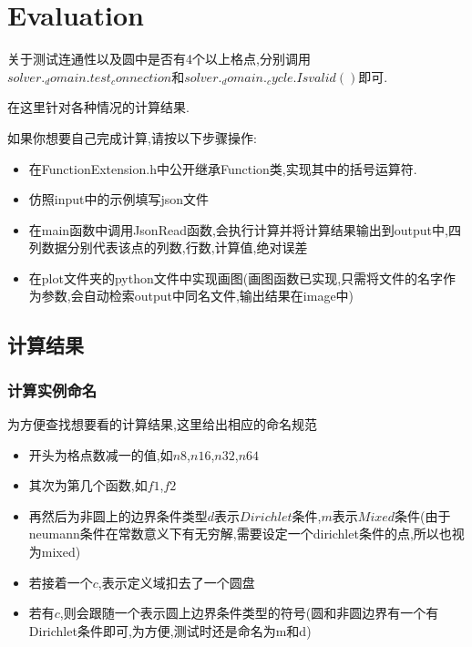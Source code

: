 \chapter{Evaluation}
\label{ch:evaluation}



关于测试连通性以及圆中是否有4个以上格点,分别调用$solver._domain.test_connection$和$solver._domain._cycle.Isvalid()$即可.

在这里针对各种情况的计算结果.

如果你想要自己完成计算,请按以下步骤操作:
\begin{itemize}
    \item 在FunctionExtension.h中公开继承Function类,实现其中的括号运算符.
    \item 仿照input中的示例填写json文件
    \item 在main函数中调用JsonRead函数,会执行计算并将计算结果输出到output中,四列数据分别代表该点的列数,行数,计算值,绝对误差
    \item 在plot文件夹的python文件中实现画图(画图函数已实现,只需将文件的名字作为参数,会自动检索output中同名文件,输出结果在image中)
\end{itemize}

\section{计算结果}

\subsection{计算实例命名}

为方便查找想要看的计算结果,这里给出相应的命名规范
\begin{itemize}
    \item 开头为格点数减一的值,如$n8$,$n16$,$n32$,$n64$
    \item 其次为第几个函数,如$f1$,$f2$
    \item 再然后为非圆上的边界条件类型$d$表示$Dirichlet$条件,$m$表示$Mixed$条件(由于neumann条件在常数意义下有无穷解,需要设定一个dirichlet条件的点,所以也视为mixed)
    \item 若接着一个$c$,表示定义域扣去了一个圆盘
    \item 若有$c$,则会跟随一个表示圆上边界条件类型的符号(圆和非圆边界有一个有Dirichlet条件即可,为方便,测试时还是命名为m和d)
\end{itemize}

